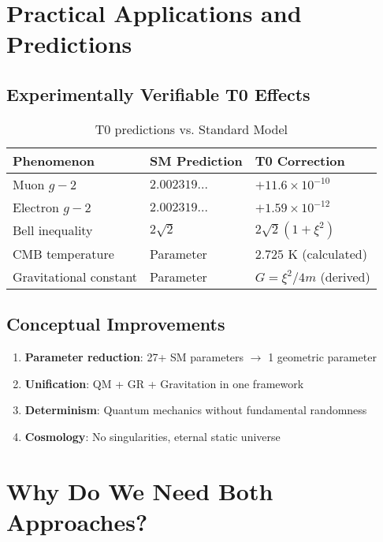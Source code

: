 \documentclass[12pt,a4paper]{article}
\begin{document}
	\section{Practical Applications and Predictions}
	
	\subsection{Experimentally Verifiable T0 Effects}
	
	\begin{table}[h]
		\centering
		\begin{tabular}{|l|l|l|}
			\hline
			\textbf{Phenomenon} & \textbf{SM Prediction} & \textbf{T0 Correction} \\
			\hline
			Muon $g-2$ & $2.002319...$ & $+11.6 \times 10^{-10}$ \\
			Electron $g-2$ & $2.002319...$ & $+1.59 \times 10^{-12}$ \\
			Bell inequality & $2\sqrt{2}$ & $2\sqrt{2}(1 + \xi^2)$ \\
			CMB temperature & Parameter & $2.725$ K (calculated) \\
			Gravitational constant & Parameter & $G = \xi^2/4m$ (derived) \\
			\hline
		\end{tabular}
		\caption{T0 predictions vs. Standard Model}
	\end{table}
	
	\subsection{Conceptual Improvements}
	
	\begin{enumerate}
		\item \textbf{Parameter reduction}: 27+ SM parameters $\to$ 1 geometric parameter
		\item \textbf{Unification}: QM + GR + Gravitation in one framework
		\item \textbf{Determinism}: Quantum mechanics without fundamental randomness
		\item \textbf{Cosmology}: No singularities, eternal static universe
	\end{enumerate}
	
	\section{Why Do We Need Both Approaches?}
	
\end{document}
